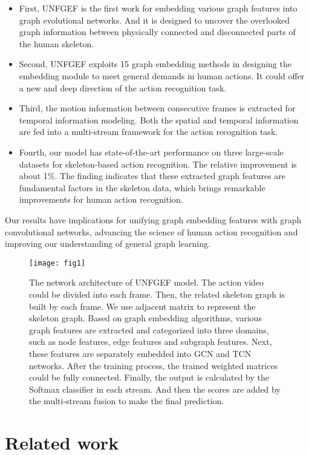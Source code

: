 \documentclass[journal]{IEEEtran}
\begin{document}
\begin{itemize}

    \item First, UNFGEF is the first work for embedding various graph features into graph evolutional networks. And it is designed to uncover the overlooked graph information between physically connected and disconnected parts of the human skeleton.
    \item Second, UNFGEF exploits 15 graph embedding methods in designing the embedding module to meet general demands in human actions. It could offer a new and deep direction of the action recognition task.
    \item Third, the motion information between consecutive frames is extracted for temporal information modeling. Both the spatial and temporal information are fed into a multi-stream framework for the action recognition task.
    \item Fourth, our model has state-of-the-art performance on three large-scale datasets for skeleton-based action recognition. The relative improvement is about 1\%. The finding indicates that these extracted graph features are fundamental factors in the skeleton data, which brings remarkable improvements for human action recognition.

\end{itemize}


Our results have implications for unifying graph embedding features with graph convolutional networks, advancing the science of human action recognition and improving our understanding of general graph learning.
\begin{figure*}
\centering
\texttt{[image: fig1]}
\caption{The network architecture of UNFGEF model. The action video could be divided into each frame. Then, the related skeleton graph is built by each frame. We use adjacent matrix to represent the skeleton graph. Based on graph embedding algorithms, various graph features are extracted and categorized into three domains, such as node features, edge features and subgraph features. Next, these features are separately embedded into GCN and TCN networks. After the training process, the trained weighted matrices could be fully connected. Finally, the output is calculated by the Softmax classifier in each stream. And then the scores are added by the multi-stream fusion to make the final prediction.}
\label{fig1}
\end{figure*}


\section{Related work}
\end{document}
